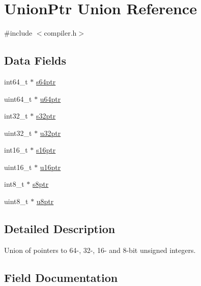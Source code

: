 \hypertarget{union_union_ptr}{}\section{Union\+Ptr Union Reference}
\label{union_union_ptr}


{\ttfamily \#include $<$compiler.\+h$>$}

\subsection*{Data Fields}
\begin{DoxyCompactItemize}
\item 
int64\+\_\+t $\ast$ \mbox{\hyperlink{union_union_ptr_ab436f27258753b9cf149312d1e668d7e}{s64ptr}}
\item 
uint64\+\_\+t $\ast$ \mbox{\hyperlink{union_union_ptr_a01a7db75ae97caa7457038b8ee801d1f}{u64ptr}}
\item 
int32\+\_\+t $\ast$ \mbox{\hyperlink{union_union_ptr_a106ea0461fc89cf4c58cec908c448aef}{s32ptr}}
\item 
uint32\+\_\+t $\ast$ \mbox{\hyperlink{union_union_ptr_a00500224ac165192ac888251a076606d}{u32ptr}}
\item 
int16\+\_\+t $\ast$ \mbox{\hyperlink{union_union_ptr_a55c23b18ff2cf478679ca49da3927345}{s16ptr}}
\item 
uint16\+\_\+t $\ast$ \mbox{\hyperlink{union_union_ptr_a15c8362aa58f36ae5de7f6180550d6b5}{u16ptr}}
\item 
int8\+\_\+t $\ast$ \mbox{\hyperlink{union_union_ptr_a874b2108143ffd4d2a83baa5d8fa8cad}{s8ptr}}
\item 
uint8\+\_\+t $\ast$ \mbox{\hyperlink{union_union_ptr_acc04e057a962c975bbdf62664c52ff2c}{u8ptr}}
\end{DoxyCompactItemize}


\subsection{Detailed Description}
Union of pointers to 64-\/, 32-\/, 16-\/ and 8-\/bit unsigned integers. 

\subsection{Field Documentation}
\mbox{\label{union_union_ptr_a55c23b18ff2cf478679ca49da3927345}} 
